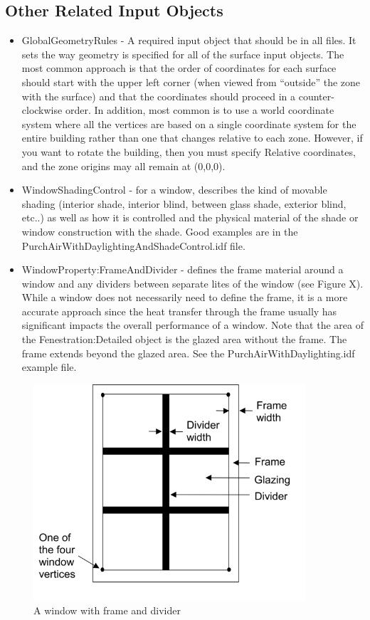 \subsection*{Other Related Input Objects}
\begin{itemize}
\item GlobalGeometryRules - A required input object that should be in all
files. It sets the way geometry is specified for all of the surface
input objects. The most common approach is that the order of coordinates
for each surface should start with the upper left corner (when viewed
from ``outside'' the zone with the surface) and that the coordinates
should proceed in a counter-clockwise order. In addition, most common
is to use a world coordinate system where all the vertices are based
on a single coordinate system for the entire building rather than
one that changes relative to each zone. However, if you want to rotate
the building, then you must specify Relative coordinates, and the
zone origins may all remain at (0,0,0).
\item WindowShadingControl - for a window, describes the kind of movable
shading (interior shade, interior blind, between glass shade, exterior
blind, etc..) as well as how it is controlled and the physical material
of the shade or window construction with the shade. Good examples
are in the PurchAirWithDaylightingAndShadeControl.idf file.
\item WindowProperty:FrameAndDivider - defines the frame material around
a window and any dividers between separate lites of the window (see
Figure X). While a window does not necessarily need to define the
frame, it is a more accurate approach since the heat transfer through
the frame usually has significant impacts the overall performance
of a window. Note that the area of the Fenestration:Detailed object
is the glazed area without the frame. The frame extends beyond the
glazed area. See the PurchAirWithDaylighting.idf example file.
\end{itemize}

\begin{figure}[hbtp]
\centering
\includegraphics[width=0.9\textwidth, height=0.9\textheight, keepaspectratio=true]{media/window_frame_and_divider.png}
\caption{A window with frame and divider}
\end{figure}


